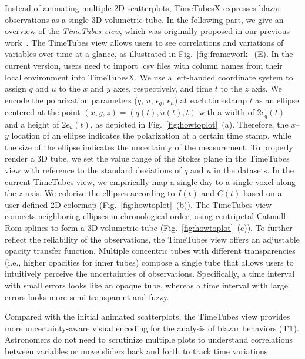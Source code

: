 Instead of animating multiple 2D scatterplots,
TimeTubesX expresses blazar observations as a single 3D volumetric tube. 
In the following part, we give an overview of the \emph{TimeTubes view}, which was originally proposed in our previous work~\cite{Fujishiro2018}.
The TimeTubes view %
allows users to see correlations and variations of variables over time at a glance, as illustrated in Fig.~\ref{fig:framework}~(E).
In the current version, users need to import .csv files with column names from their local environment into TimeTubesX.
%
We use a left-handed coordinate system to assign $q$ and $u$ to the $x$ and $y$ axes, respectively, and time $t$ to the $z$ axis.
We encode the polarization parameters ($q$, $u$, $\epsilon_q$, $\epsilon_u$) at each timestamp $t$ as an ellipse centered at the point $(x, y, z) = (q(t), u(t), t)$ with a width of $2\epsilon_q(t)$ and a height of $2\epsilon_u(t)$, as depicted in Fig.~\ref{fig:howtoplot}~(a). 
Therefore, the $x$--$y$ location of an ellipse indicates the polarization at a certain time stamp, while the size of the ellipse indicates the uncertainty of the measurement.
To properly render a 3D tube, we set the value range of the Stokes plane in the TimeTubes view with reference to the standard deviations of $q$ and $u$ in the datasets. 
In the current TimeTubes view, we empirically map a single day to a single voxel along the $z$ axis.
%
We colorize the ellipses according to $I(t)$ and $C(t)$ based on a user-defined 2D colormap (Fig.~\ref{fig:howtoplot}~(b)). 
The TimeTubes view connects neighboring ellipses in chronological order, using centripetal Catmull-Rom splines to form a 3D volumetric tube (Fig.~\ref{fig:howtoplot}~(c)). 
To further reflect the reliability of the observations, the TimeTubes view offers an adjustable opacity transfer function.
Multiple concentric tubes with different transparencies (i.e., higher opacities for inner tubes) compose a single tube that allows users to intuitively perceive the uncertainties of observations.
Specifically, a time interval with small errors looks like an opaque tube, whereas a time interval with large errors looks more semi-transparent and fuzzy.

Compared with the initial animated scatterplots,
the TimeTubes view provides more uncertainty-aware visual encoding for the analysis of blazar behaviors (\textbf{T1}).
Astronomers do not need to scrutinize multiple plots to understand correlations between variables
or move sliders back and forth %
to track time variations.

